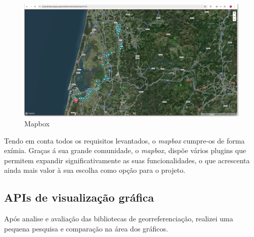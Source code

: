 \begin{figure}[h!]
    \centering
    \includegraphics[width=\textwidth]{figs/mapbox.png}
    \caption[Mapbox]{Mapbox}
    \label{fig:mapbox}
\end{figure}

Tendo em conta todos os requisitos levantados, o \textit{mapbox} cumpre-os de forma exímia. Graças á sua grande comunidade, o \textit{mapbox}, dispõe vários plugins que permitem expandir significativamente as suas funcionalidades, o que acrescenta ainda mais valor à sua escolha como opção para o projeto.



\clearpage

\subsection{APIs de visualização gráfica}
Após analise e avaliação das bibliotecas de georreferenciação, realizei uma pequena pesquisa e comparação na área dos gráficos.

